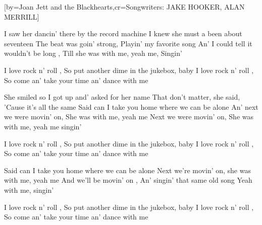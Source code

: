  

[by={Joan Jett and the Blackhearts},cr={Songwriters: JAKE HOOKER, ALAN MERRILL}]


\beginverse
I saw her dancin' there by the record machine 
I knew she must a been about seventeen 
The beat was goin' strong, \brk  Playin' my favorite song 
 An' I could tell it wouldn't be long , \brk  Till she was with me, yeah me, 
Singin' 
\endverse

\beginchorus
I love rock n' roll , \brk  So put another dime in the jukebox, baby 
I love rock n' roll , \brk  So come an' take your time an' dance with me 
\endchorus

\beginverse
She smiled so I got up and' asked for her name 
That don't matter, she said, \brk  'Cause it's all the same 
Said can I take you home where we can be alone 
An' next we were movin' on, \brk  She was with me, yeah me 
Next we were movin' on, \brk  She was with me, yeah me singin'
\endverse

\beginchorus
I love rock n' roll , \brk  So put another dime in the jukebox, baby 
I love rock n' roll , \brk  So come an' take your time an' dance with me 
\endchorus

\beginverse
[SOLO]
\endverse

\beginverse
Said can I take you home where we can be alone 
Next we're movin' on, \brk  she was with me, yeah me 
And we'll be movin' on , \brk  An' singin' that same old song 
Yeah with me, singin' 
\endverse

\beginchorus
{} I love rock n' roll , \brk  So put another dime in the jukebox, baby 
I love rock n' roll , \brk  So come an' take your time an' dance with me 
\endchorus






\endsong
